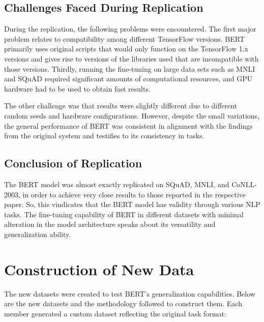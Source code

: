 ﻿\documentclass{article}
\begin{document}
\subsection{Challenges Faced During Replication}
During the replication, the following problems were encountered. The first major problem relates to compatibility among different TensorFlow versions. BERT primarily uses original scripts that would only function on the TensorFlow 1.x versions and gives rise to versions of the libraries used that are incompatible with those versions. Thirdly, running the fine-tuning on large data sets such as MNLI and SQuAD required significant amounts of computational resources, and GPU hardware had to be used to obtain fast results.

The other challenge was that results were slightly different due to different random seeds and hardware configurations. However, despite the small variations, the general performance of BERT was consistent in alignment with the findings from the original system and testifies to its consistency in tasks.

\subsection{Conclusion of Replication}
The BERT model was almost exactly replicated on SQuAD, MNLI, and CoNLL-2003, in order to achieve very close results to those reported in the respective paper. So, this vindicates that the BERT model has validity through various NLP tasks. The fine-tuning capability of BERT in different datasets with minimal alteration in the model architecture speaks about its versatility and generalization ability.


\section{Construction of New Data}
The new datasets were created to test BERT’s generalization capabilities. Below are the new datasets and the methodology followed to construct them.
Each member generated a custom dataset reflecting the original task format:
\end{document}
